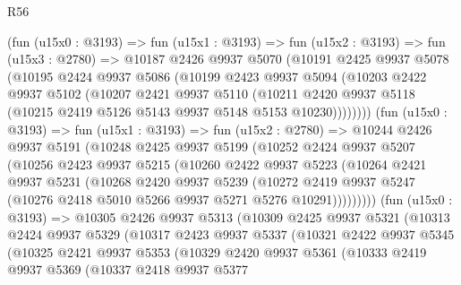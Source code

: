 \begin{lexlean}{R56}
\begin{coremodule}
        (fun (u15x0 : @3193) =>
        fun (u15x1 : @3193) =>
        fun (u15x2 : @3193) =>
        fun (u15x3 : @2780) =>
        @10187
          @2426
          @9937
          @5070
          (@10191
            @2425
            @9937
            @5078
            (@10195
              @2424
              @9937
              @5086
              (@10199
                @2423
                @9937
                @5094
                (@10203
                  @2422
                  @9937
                  @5102
                  (@10207
                    @2421
                    @9937
                    @5110
                    (@10211
                      @2420
                      @9937
                      @5118
                      (@10215 @2419 @5126 @5143 @9937 @5148 @5153 @10230))))))))
        (fun (u15x0 : @3193) =>
        fun (u15x1 : @3193) =>
        fun (u15x2 : @2780) =>
        @10244
          @2426
          @9937
          @5191
          (@10248
            @2425
            @9937
            @5199
            (@10252
              @2424
              @9937
              @5207
              (@10256
                @2423
                @9937
                @5215
                (@10260
                  @2422
                  @9937
                  @5223
                  (@10264
                    @2421
                    @9937
                    @5231
                    (@10268
                      @2420
                      @9937
                      @5239
                      (@10272
                        @2419
                        @9937
                        @5247
                        (@10276 @2418 @5010 @5266 @9937 @5271 @5276 @10291)))))))))
        (fun (u15x0 : @3193) =>
        @10305
          @2426
          @9937
          @5313
          (@10309
            @2425
            @9937
            @5321
            (@10313
              @2424
              @9937
              @5329
              (@10317
                @2423
                @9937
                @5337
                (@10321
                  @2422
                  @9937
                  @5345
                  (@10325
                    @2421
                    @9937
                    @5353
                    (@10329
                      @2420
                      @9937
                      @5361
                      (@10333
                        @2419
                        @9937
                        @5369
                        (@10337
                          @2418
                          @9937
                          @5377

\end{coremodule}
\end{lexlean}
